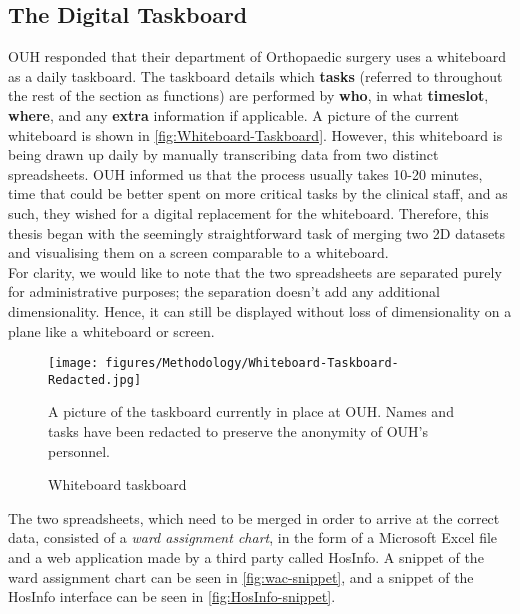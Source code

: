 \subsection{The Digital Taskboard}\label{sec:Digital-Taskboard}
OUH responded that their department of Orthopaedic surgery uses a whiteboard as a daily taskboard. The taskboard details which \textbf{tasks} (referred to throughout the rest of the section as \gls{functions}) are performed by \textbf{who}, in what \textbf{timeslot}, \textbf{where}, and any \textbf{extra} information if applicable. A picture of the current whiteboard is shown in \autoref{fig:Whiteboard-Taskboard}. However, this whiteboard is being drawn up daily by manually transcribing data from two distinct spreadsheets. OUH  informed us that the process usually takes 10-20 minutes, time that could be better spent on more critical tasks by the clinical staff, and as such, they wished for a digital replacement for the whiteboard. Therefore, this thesis began with the seemingly straightforward task of merging two 2D datasets and visualising them on a screen comparable to a whiteboard.
\\
For clarity, we would like to note that the two spreadsheets are separated purely for administrative purposes; the separation doesn't add any additional dimensionality. Hence, it can still be displayed without loss of dimensionality on a plane like a whiteboard or screen. 

\begin{figure}[H]
    \centering
    \texttt{[image: figures/Methodology/Whiteboard-Taskboard-Redacted.jpg]}
    \caption{Whiteboard taskboard}
    \small
    \raggedright 
    A picture of the taskboard currently in place at OUH. Names and tasks have been redacted to preserve the anonymity of OUH's personnel. 
    \label{fig:Whiteboard-Taskboard}
\end{figure}

The two spreadsheets, which need to be merged in order to arrive at the correct data, consisted of a \emph{ward assignment chart}, in the form of a Microsoft Excel file and a web application made by a third party called HosInfo. A snippet of the ward assignment chart can be seen in \autoref{fig:wac-snippet}, and a snippet of the HosInfo interface can be seen in \autoref{fig:HosInfo-snippet}.

